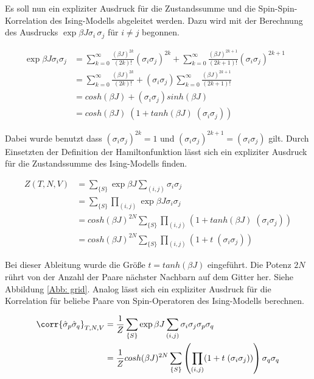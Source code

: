  \noindent Es soll nun ein expliziter Ausdruck für die Zustandssumme und die Spin-Spin-Korrelation des Ising-Modells abgeleitet werden. Dazu wird mit der Berechnung des Ausdrucks $\exp{\beta J \sigma_i \, \sigma_j} $ für $i \neq j$ begonnen.

\begin{align}
\exp{\beta J \sigma_i \sigma_j} & = \sum_{k=0}^{\infty} \frac{(\beta J)^{2k}}{(2k)!}(\sigma_i \sigma_j)^{2k} + \sum_{k=0}^{\infty} \frac{(\beta J)^{2k+1}}{(2k+1)!}(\sigma_i \sigma_j)^{2k+1}  &\\
& = \sum_{k=0}^{\infty} \frac{(\beta J)^{2k}}{(2k)!} + (\sigma_i \sigma_j) \sum_{k=0}^{\infty} \frac{(\beta J)^{2k+1}}{(2k+1)!} &\\
& = cosh(\beta J) + (\sigma_i \sigma_j) sinh(\beta J) &\\
& = cosh(\beta J) \; (1 +  tanh(\beta J) \; (\sigma_i \sigma_j)) \label{eq: exp(beta J sig sig)}
\end{align}

\noindent Dabei wurde benutzt dass $(\sigma_i \sigma_j)^{2k} = 1$ und $(\sigma_i \sigma_j)^{2k+1} = (\sigma_i \sigma_j)$ gilt. Durch Einsetzten der Definition der Hamiltonfunktion lässt sich ein expliziter Ausdruck für die Zustandssumme des Ising-Modells finden. 

\begin{align} 
    Z(T,N,V) 
    &  = \sum_{\{S\}} \exp{\beta J \sum_{(i,j)} \sigma_i \sigma_j } \\
    &  = \sum_{\{S\}} \prod_{(i,j)} \exp{\beta J \sigma_i \sigma_j } \\
    &  = cosh(\beta J)^{2N} \sum_{\{S\}} \prod_{(i,j)} (1 +  tanh(\beta J) \; (\sigma_i \sigma_j)) \\
    &  = cosh(\beta J)^{2N} \sum_{\{S\}} \prod_{(i,j)} (1 +  t \; (\sigma_i \sigma_j))
\end{align}

\noindent Bei dieser Ableitung wurde die Größe $t = tanh(\beta J)$ eingeführt. Die Potenz $2N$ rührt von der Anzahl der Paare nächster Nachbarn auf dem Gitter her. Siehe Abbildung \ref{Abb: grid}. Analog lässt sich ein expliziter Ausdruck für die Korrelation für beliebe Paare von Spin-Operatoren des Ising-Modells berechnen.

\begin{align} 
    \corr{\hat{\sigma}_{p} \hat{\sigma}_{q} }_{T,N,V}  
    & = \frac{1}{Z} \sum_{\{S\}} \exp{\beta J \sum_{(i,j)} \sigma_i \sigma_j } \sigma_{p} \sigma_{q} \\
    & = \frac{1}{Z} cosh(\beta J)^{2N} \sum_{\{S\}} \left(\prod_{(i,j)} (1 +  t \; (\sigma_i \sigma_j) )\right) \sigma_{q} \sigma_{q} 
\end{align}

